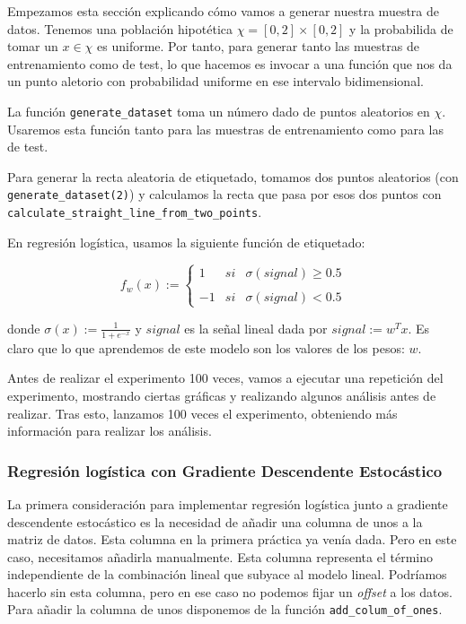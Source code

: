 \documentclass[11pt]{article}
\begin{document}
Empezamos esta sección explicando cómo vamos a generar nuestra muestra de datos. Tenemos una población hipotética $\chi = [0, 2] \times [0, 2]$ y la probabilida de tomar un $x \in \chi$ es uniforme. Por tanto, para generar tanto las muestras de entrenamiento como de test, lo que hacemos es invocar a una función que nos da un punto aletorio con probabilidad uniforme en ese intervalo bidimensional.

La función \lstinline{generate_dataset} toma un número dado de puntos aleatorios en $\chi$. Usaremos esta función tanto para las muestras de entrenamiento como para las de test.

Para generar la recta aleatoria de etiquetado, tomamos dos puntos aleatorios (con \lstinline{generate_dataset(2)}) y calculamos la recta que pasa por esos dos puntos con \lstinline{calculate_straight_line_from_two_points}.

En regresión logística, usamos la siguiente función de etiquetado:

$$
f_w(x):= \left\{ \begin{array}{lcc}
        1 &  si & \sigma(signal) \geq 0.5 \\
    \\ -1 &  si & \sigma(signal) < 0.5
    \end{array}
\right.
$$

donde $\sigma(x) := \frac{1}{1 + e^{-x}}$ y $signal$ es la señal lineal dada por $signal := w^T x$. Es claro que lo que aprendemos de este modelo son los valores de los pesos: $w$.

Antes de realizar el experimento 100 veces, vamos a ejecutar una repetición del experimento, mostrando ciertas gráficas y realizando algunos análisis antes de realizar. Tras esto, lanzamos 100 veces el experimento, obteniendo más información para realizar los análisis.

\subsubsection{Regresión logística con Gradiente Descendente Estocástico}

La primera consideración para implementar regresión logística junto a gradiente descendente estocástico es la necesidad de añadir una columna de unos a la matriz de datos. Esta columna en la primera práctica ya venía dada. Pero en este caso, necesitamos añadirla manualmente. Esta columna representa el término independiente de la combinación lineal que subyace al modelo lineal. Podríamos hacerlo sin esta columna, pero en ese caso no podemos fijar un \emph{offset} a los datos. Para añadir la columna de unos disponemos de la función \lstinline{add_colum_of_ones}.
\end{document}

